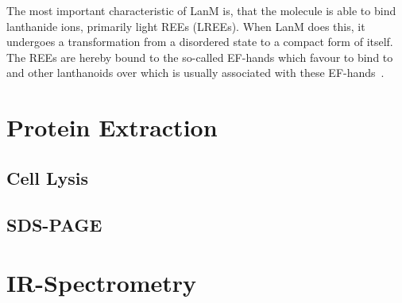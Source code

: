 The most important characteristic of LanM is, that the molecule is able to bind lanthanide ions, primarily light REEs (LREEs).
When LanM does this, it undergoes a transformation from a disordered state to a compact form of itself.
The REEs are hereby bound to the so-called EF-hands which favour to bind to  and other lanthanoids over  which is usually associated with these EF-hands~\cite{lanmstructure}.


\section{Protein Extraction\authorB{}}

\subsection{Cell Lysis}

\subsection{SDS-PAGE}

\section{IR-Spectrometry\authorB{}}